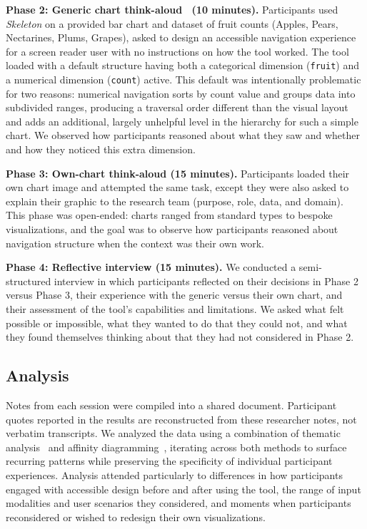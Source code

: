 \documentclass[12pt]{cmuthesis}
\begin{document}
\textbf{Phase 2: Generic chart think-aloud~\cite{Alhadreti2018} (10 minutes).} Participants used \textit{Skeleton} on a provided bar chart and dataset of fruit counts (Apples, Pears, Nectarines, Plums, Grapes), asked to design an accessible navigation experience for a screen reader user with no instructions on how the tool worked. The tool loaded with a default structure having both a categorical dimension (\texttt{fruit}) and a numerical dimension (\texttt{count}) active. This default was intentionally problematic for two reasons: numerical navigation sorts by count value and groups data into subdivided ranges, producing a traversal order different than the visual layout and adds an additional, largely unhelpful level in the hierarchy for such a simple chart. We observed how participants reasoned about what they saw and whether and how they noticed this extra dimension.

\textbf{Phase 3: Own-chart think-aloud (15 minutes).} Participants loaded their own chart image and attempted the same task, except they were also asked to explain their graphic to the research team (purpose, role, data, and domain). This phase was open-ended: charts ranged from standard types to bespoke visualizations, and the goal was to observe how participants reasoned about navigation structure when the context was their own work.

\textbf{Phase 4: Reflective interview (15 minutes).} We conducted a semi-structured interview in which participants reflected on their decisions in Phase 2 versus Phase 3, their experience with the generic versus their own chart, and their assessment of the tool's capabilities and limitations. We asked what felt possible or impossible, what they wanted to do that they could not, and what they found themselves thinking about that they had not considered in Phase 2.

\subsection{Analysis}

Notes from each session were compiled into a shared document. Participant quotes reported in the results are reconstructed from these researcher notes, not verbatim transcripts. We analyzed the data using a combination of thematic analysis~\cite{Braun2006Using} and affinity diagramming~\cite{Harboe2015}, iterating across both methods to surface recurring patterns while preserving the specificity of individual participant experiences. Analysis attended particularly to differences in how participants engaged with accessible design before and after using the tool, the range of input modalities and user scenarios they considered, and moments when participants reconsidered or wished to redesign their own visualizations.
\end{document}
